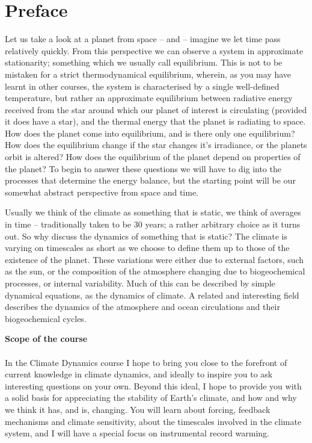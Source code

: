 \documentclass[12pt]{book}
\title{\DocTitle}
\author{Thorsten Mauritsen}
\date{\today}
\begin{document}
 
\maketitle
\tableofcontents



\frontmatter
{}
\chapter{Preface}
Let us take a look at a planet from space -- and -- imagine we let time pass relatively quickly. From this perspective we can observe a system in approximate stationarity; something which we usually call equilibrium. This is not to be mistaken for a strict thermodynamical equilibrium, wherein, as you may have learnt in other courses, the system is characterised by a single well-defined temperature, but rather an approximate equilibrium between radiative energy received from the star around which our planet of interest is circulating (provided it does have a star), and the thermal energy that the planet is radiating to space. How does the planet come into equilibrium, and is there only one equilibrium? How does the equilibrium change if the star changes it's irradiance, or the planets orbit is altered? How does the equilibrium of the planet depend on properties of the planet? To begin to answer these questions we will have to dig into the processes that determine the energy balance, but the starting point will be our somewhat abstract perspective from space and time.

Usually we think of the climate as something that is static, we think of averages in time -- traditionally taken to be 30 years; a rather arbitrary choice as it turns out. So why discuss the dynamics of something that is static? The climate is varying on timescales as short as we choose to define them up to those of the existence of the planet. These variations were either due to external factors, such as the sun, or  the composition of the atmosphere changing due to biogeochemical processes, or internal variability. Much of this can be described by simple dynamical equations, as the dynamics of climate. A related and interesting field describes the dynamics of the atmosphere and ocean circulations and their biogeochemical cycles. 

\vspace{1.0 cm}
\noindent
{\bf \LARGE Scope of the course}
\\
\\
\noindent In the Climate Dynamics course I hope to bring you close to the forefront of current knowledge in climate dynamics, and ideally to inspire you to ask interesting questions on your own. Beyond this ideal, I hope to provide you with a solid basis for appreciating the stability of Earth's climate, and how and why we think it has, and is, changing. You will learn about forcing, feedback mechanisms and climate sensitivity, about the timescales involved in the climate system, and I will have a special focus on instrumental record warming. 
\end{document}

